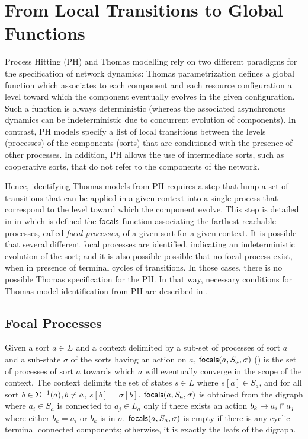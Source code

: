 \section{From Local Transitions to Global Functions}\label{sec:tr2global}

Process Hitting (PH) and Thomas modelling rely on two different paradigms for the specification of
network dynamics:
Thomas parametrization defines a global function
which associates to each component and each resource configuration a level toward which the component
eventually evolves in the given configuration.
Such a function is always deterministic (whereas the associated asynchronous dynamics can be
indeterministic due to concurrent evolution of components).
In contrast, 
PH models specify a list of local transitions between the levels (processes) of the components (sorts)
that are conditioned with the presence of other processes.
In addition, PH allows the use of intermediate sorts, such as cooperative sorts, that do not refer
to the components of the network.

Hence, identifying Thomas models from PH requires a step that lump a set of transitions that can be
applied in a given context into a single process that correspond to the level toward which the
component evolve.
This step is detailed in  in which is defined the $\mathsf{focals}$ function associating 
the farthest reachable processes, called \emph{focal processes}, of a given sort for a given context.
It is possible that several different focal processes are identified, indicating an indeterministic
evolution of the sort;
and it is also possible possible that no focal process exist, when in presence of terminal cycles of
transitions.
In those cases, there is no possible Thomas specification for the PH.
In that way, necessary conditions for Thomas model identification from PH are described in
.

\subsection{Focal Processes}\label{ssec:focal}

Given a sort $a\in\Sigma$ and a context delimited by 
a sub-set of processes of sort $a$ and a sub-state $\sigma$
of the sorts having an action on $a$,
$\mathsf{focals}(a,S_a,\sigma)$ () is the set of processes of sort $a$ towards which
$a$ will eventually converge in the scope of the context.
The context delimits the set of states $s\in L$ where $s[a]\in S_a$, and for all 
sort $b\in\Sigma^{-1}(a), b\neq a$,
$s[b]=\sigma[b]$.
$\mathsf{focals}(a,S_a,\sigma)$ is obtained from the digraph where $a_i\in S_a$ is connected to $a_j\in L_a$ only if there
exists an action $b_k\rightarrow a_i\Rsh a_j$ where either $b_k = a_i$ or $b_k$ is in $\sigma$.
$\mathsf{focals}(a,S_a,\sigma)$ is empty if there is any cyclic terminal connected components;
otherwise, it is exactly the leafs of the digraph.


